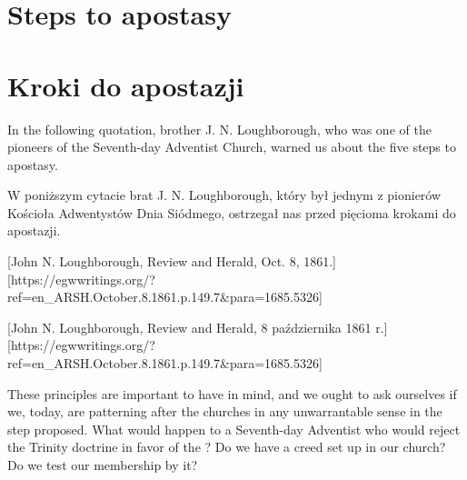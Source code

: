 \chapter{Steps to apostasy}


\chapter{Kroki do apostazji}


In the following quotation, brother J. N. Loughborough, who was one of the pioneers of the Seventh-day Adventist Church, warned us about the five steps to apostasy.


W poniższym cytacie brat J. N. Loughborough, który był jednym z pionierów Kościoła Adwentystów Dnia Siódmego, ostrzegał nas przed pięcioma krokami do apostazji.


[John N. Loughborough, Review and Herald, Oct. 8, 1861.][https://egwwritings.org/?ref=en\_ARSH.October.8.1861.p.149.7&para=1685.5326]


[John N. Loughborough, Review and Herald, 8 października 1861 r.][https://egwwritings.org/?ref=en\_ARSH.October.8.1861.p.149.7&para=1685.5326]


These principles are important to have in mind, and we ought to ask ourselves if we, today, are patterning after the churches in any unwarrantable sense in the step proposed. What would happen to a Seventh-day Adventist who would reject the Trinity doctrine in favor of the ? Do we have a creed set up in our church? Do we test our membership by it?


